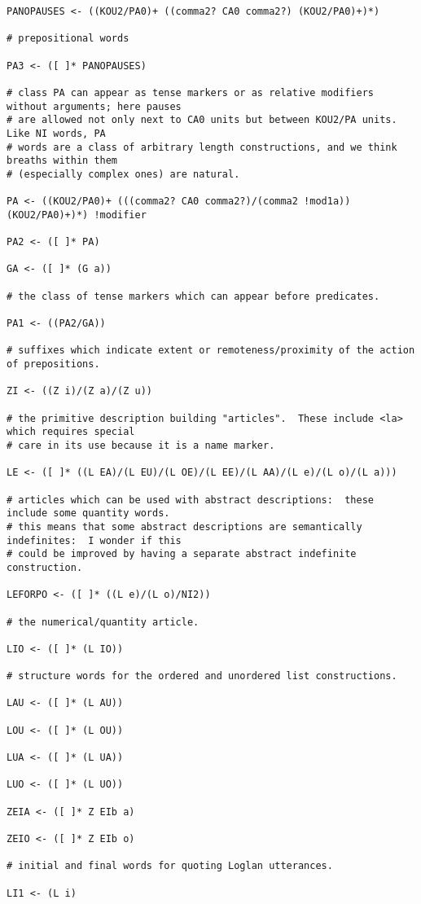 \documentclass[12pt]{book}
\begin{document}
{\begin{verbatim}
PANOPAUSES <- ((KOU2/PA0)+ ((comma2? CA0 comma2?) (KOU2/PA0)+)*)

# prepositional words

PA3 <- ([ ]* PANOPAUSES)

# class PA can appear as tense markers or as relative modifiers without arguments; here pauses
# are allowed not only next to CA0 units but between KOU2/PA units.  Like NI words, PA
# words are a class of arbitrary length constructions, and we think breaths within them
# (especially complex ones) are natural.

PA <- ((KOU2/PA0)+ (((comma2? CA0 comma2?)/(comma2 !mod1a)) (KOU2/PA0)+)*) !modifier

PA2 <- ([ ]* PA)

GA <- ([ ]* (G a))

# the class of tense markers which can appear before predicates.

PA1 <- ((PA2/GA))

# suffixes which indicate extent or remoteness/proximity of the action of prepositions.

ZI <- ((Z i)/(Z a)/(Z u))

# the primitive description building "articles".  These include <la> which requires special
# care in its use because it is a name marker.

LE <- ([ ]* ((L EA)/(L EU)/(L OE)/(L EE)/(L AA)/(L e)/(L o)/(L a)))

# articles which can be used with abstract descriptions:  these include some quantity words.
# this means that some abstract descriptions are semantically indefinites:  I wonder if this
# could be improved by having a separate abstract indefinite construction.

LEFORPO <- ([ ]* ((L e)/(L o)/NI2))

# the numerical/quantity article.

LIO <- ([ ]* (L IO))

# structure words for the ordered and unordered list constructions.

LAU <- ([ ]* (L AU))

LOU <- ([ ]* (L OU))

LUA <- ([ ]* (L UA))

LUO <- ([ ]* (L UO))

ZEIA <- ([ ]* Z EIb a)

ZEIO <- ([ ]* Z EIb o)

# initial and final words for quoting Loglan utterances.

LI1 <- (L i)


\end{verbatim}}
\end{document}
